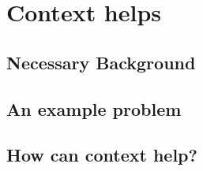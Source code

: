 \section{Context helps \name}

\subsection{Necessary Background}

\subsection{An example problem}

\subsection{How can context help?}


